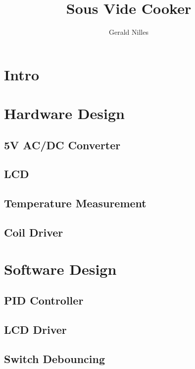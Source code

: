 \documentclass[12pt,letterpaper]{article}
\author{Gerald Nilles}
\title{Sous Vide Cooker}
\begin{document}
\maketitle

\tableofcontents

\newpage


\section{Intro}

\section{Hardware Design}
\subsection{5V AC/DC Converter}
\subsection{LCD}
\subsection{Temperature Measurement}
\subsection{Coil Driver}

\section{Software Design}
\subsection{PID Controller}
\subsection{LCD Driver}
\subsection{Switch Debouncing}
\end{document}
